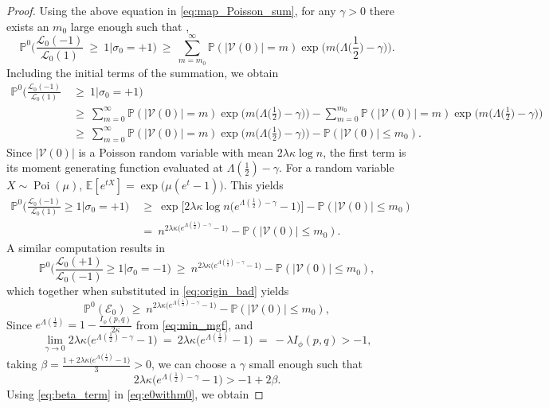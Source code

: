 \documentclass[10pt,a4paper]{amsart}
\def\E{\mathbb{E}}
\newcommand{\La}{\Lambda}
\def\P{\mathbb{P}}
\newcommand{\Poi}{\operatorname{Poi}}
\def\cE{\mathcal{E}}
\def\cL{\mathcal{L}}
\def\cV{\mathcal{V}}
\newcommand{\ga}{\gamma}
\newcommand{\ka}{\kappa}
\newcommand{\la}{\lambda}
\def\weq{ \ = \ }
\def\wge{ \ \ge \ }
\begin{document}
\begin{proof}
Using the above equation in \eqref{eq:map_Poisson_sum}, for any $\ga>0$ there exists an $m_0$ large enough such that ,
\[
 \P^0\Big( \frac{\cL_0(-1)}{\cL_0(1)}
 \wge 1\Big|\sigma_0=+1\Big)
 \wge \sum_{m=m_0}^\infty \P(|\cV(0)|=m) \exp\Big(m\Big(\La\Big(\frac{1}{2}\Big)-\ga\Big)\Big). 
\]
Including the initial terms of the summation, we obtain
\begin{align*}
 \P^0\Big( \frac{\cL_0(-1)}{\cL_0(1)} 
 &\wge 1 \Big|\sigma_0=+1\Big)\\
 &\wge  \sum_{m=0}^\infty \P(|\cV(0)|=m)\exp\Big(m\Big(\La\Big(\frac{1}{2}\Big)-\ga\Big)\Big) - \sum_{m=0}^{m_0} \P(|\cV(0)|=m)\exp\Big(m\Big(\La\Big(\frac{1}{2}\Big)-\ga\Big)\Big)\\
 &\wge \sum_{m=0}^\infty \P(|\cV(0)|=m)
  \exp\Big(m\Big(\La\Big(\frac{1}{2}\Big)-\ga\Big)\Big) - \P(|\cV(0)| \le m_0).
\end{align*}
Since $|\cV(0)|$ is a Poisson random variable with mean $2 \la \ka \log n$,
the first term is its moment generating function evaluated at
$\La(\frac{1}{2})-\ga$.
For a random variable $X\sim \Poi(\mu)$,
$\E[e^{tX}] = \exp\big(\mu (e^t-1)\big)$. 
This yields
\begin{align*}
 \P^0\Big( \frac{\cL_0(-1)}{\cL_0(1)} \ge 1\Big|\sigma_0=+1\Big)
 &\wge \exp\Big[2 \la \ka \log n \big(e^{\La(\frac{1}{2})-\ga}-1\big) \Big]-\P(|\cV(0)| \le m_0)\\ 
 &\weq n^{2 \la \ka \big(e^{\La(\frac{1}{2})-\ga}-1\big)} -\P(|\cV(0)| \le m_0).
\end{align*}
A similar computation results in 
\[
 \P^0\Big( \frac{\cL_0(+1)}{\cL_0(-1)} \ge 1\Big|\sigma_0=-1\Big)
 \wge n^{2 \la \ka \big(e^{\La(\frac{1}{2})-\ga}-1\big)} -\P(|\cV(0)| \le m_0),
\]
which together when substituted in \eqref{eq:origin_bad} yields 
\begin{equation}
 \label{eq:e0withm0}
 \P^0(\cE_0 )
 \wge n^{2 \la \ka \big(e^{\La(\frac{1}{2})-\ga}-1\big)} -\P(|\cV(0)| \le m_0),
\end{equation}
Since $e^{\La(\frac{1}{2})} =1-\frac{I_{\phi}(p,q)}{2\ka}$ from \eqref{eq:min_mgf}, and 
\[
\lim_{\ga \to 0} 2 \la \ka \big(e^{\La(\frac{1}{2})-\ga}-1\big) \weq 2 \la \ka \big(e^{\La(\frac{1}{2})}-1\big) \weq -\la I_{\phi}(p,q)>-1,
\]
taking $\beta = \frac{1+2 \la \ka \big(e^{\La(\frac{1}{2})}-1\big)}{3} > 0$, we can choose a $\ga$ small enough such that 
\begin{equation}
2 \la \ka \big(e^{\La(\frac{1}{2})-\ga}-1\big) > -1+2\beta.
\label{eq:beta_term}
\end{equation}
Using \eqref{eq:beta_term} in \eqref{eq:e0withm0}, we obtain 

\end{proof}
\end{document}
